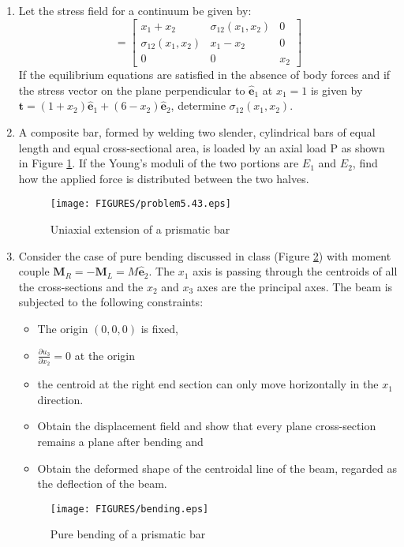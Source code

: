 \documentclass{article}
\newcommand{\ee}{\end{equation}}
\newcommand{\be}{\begin{equation}}
\newcommand{\bi}{\begin{itemize}}
\newcommand{\ei}{\end{itemize}}
\newcommand{\pa}{\partial}
\newcommand{\bs}{\boldsymbol}
\begin{document}
\begin{enumerate}
\item  Let the stress field for a continuum be given by:
\be
[\bs{\sigma}]=\left[\begin{array}{ccc} x_1+x_2 & \sigma_{12}(x_1,x_2) & 0 \\  \sigma_{12}(x_1,x_2) & x_1-x_2 & 0 \\ 0 & 0 & x_2 \end{array} \right]
\ee
If the equilibrium equations are satisfied in the absence of body forces and if the stress vector on the plane perpendicular to  $\bs{\hat{e}}_1$ at $x_1 = 1$ is given by $\bs{t} = (1 + x_2) \bs{\hat{e}}_1 + (6 -x_2 )\bs{\hat{e}}_2$, determine $\sigma_{12}(x_1,x_2)$.

\item  A composite bar, formed by welding two slender, cylindrical bars of equal length and equal cross-sectional area, is
loaded by an axial load P as shown in Figure \ref{fig:543}. If the Young's moduli of the two portions are $E_1$ and $E_2$,  find how the applied force is distributed between the two halves.
\begin{figure}[!h]
\centering
 \texttt{[image: FIGURES/problem5.43.eps]}
\caption{Uniaxial extension of a prismatic bar}
\label{fig:543}
\end{figure}

\item Consider the case of pure bending discussed in class (Figure \ref{fig:pb}) with moment couple $\bs{M}_R=-\bs{M}_L=M\hat{\bs{e}}_2$. The  $x_1$ axis is passing
through the centroids of all the cross-sections  and the  $x_2$ and $x_3$ axes are the principal axes. The beam is subjected to the following constraints: 
\bi
\item  The origin $(0,0,0)$ is fixed, 
\item $\frac{\pa u_3}{\pa x_2}=0$ at the origin
\item  the centroid at the right end section can only move horizontally in the $x_1$ direction. \ei
\bi
\item Obtain the displacement field and show that every plane cross-section remains a plane after bending and 
\item Obtain the deformed shape of the centroidal line of the beam, regarded as the deflection of the beam.
\ei
\begin{figure}[!h]
\centering
{}
 \texttt{[image: FIGURES/bending.eps]}
\caption{Pure bending of a prismatic bar}
\label{fig:pb}
\end{figure}


\end{enumerate}
\end{document}
